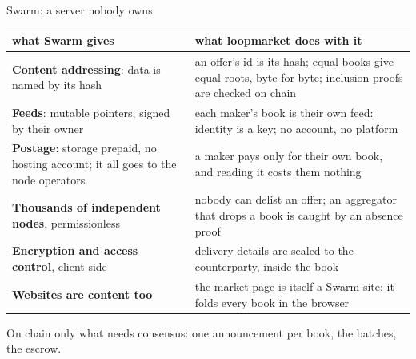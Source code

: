 \documentclass[aspectratio=169,11pt]{beamer}
\begin{document}
\begin{frame}{Swarm: a server nobody owns}
  \vspace{-1mm}
  \footnotesize
  \renewcommand{\arraystretch}{1.2}
  \begin{tabular}{@{}>{\raggedright\arraybackslash}p{57mm}>{\raggedright\arraybackslash}p{78.5mm}@{}}
    \toprule
    \textbf{\color{accent}what Swarm gives} & \textbf{\color{accent}what loopmarket does with it} \\
    \midrule
    \textbf{Content addressing}: data is named by its hash
      & an offer's id is its hash; equal books give equal roots, byte for byte; inclusion proofs are checked on chain \\
    \textbf{Feeds}: mutable pointers, signed by their owner
      & each maker's book is their own feed: identity is a key; no account, no platform \\
    \textbf{Postage}: storage prepaid, no hosting account; it all goes to the node operators
      & a maker pays only for their own book, and reading it costs them nothing \\
    \textbf{Thousands of independent nodes}, permissionless
      & nobody can delist an offer; an aggregator that drops a book is caught by an absence proof \\
    \textbf{Encryption and access control}, client side
      & delivery details are sealed to the counterparty, inside the book \\
    \textbf{Websites are content too}
      & the market page is itself a Swarm site: it folds every book in the browser \\
    \bottomrule
  \end{tabular}
  \vspace{2.5mm}

  On chain only what needs consensus: one announcement per book, the batches, the escrow.
\end{frame}
\end{document}
